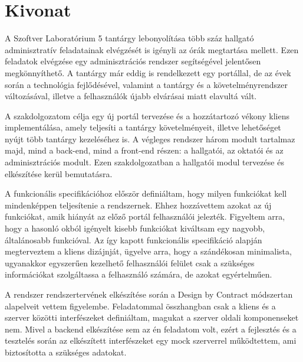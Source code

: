 \setcounter{page}{1}

\hungarianParagraph


\chapter*{Kivonat}

A Szoftver Laboratórium 5 tantárgy lebonyolítása több száz hallgató adminisztratív feladatainak elvégzését is igényli az órák megtartása mellett. Ezen feladatok elvégzése egy adminisztrációs rendszer segítségével jelentősen megkönnyíthető. A tantárgy már eddig is rendelkezett egy portállal, de az évek során a technológia fejlődésével, valamint a tantárgy és a követelményrendszer változásával, illetve a felhasználók újabb elvárásai miatt elavultá vált. 

A szakdolgozatom célja egy új portál tervezése és a hozzátartozó vékony kliens implementálása, amely teljesíti a tantárgy követelményeit, illetve lehetőséget nyújt több tantárgy kezeléséhez is. A végleges rendszer három modult tartalmaz majd, mind a back-end, mind a front-end részen: a hallgatói, az oktatói és az adminisztrációs modult. Ezen szakdolgozatban a hallgatói modul tervezése és elkészítése kerül bemutatásra.

A funkcionális specifikációhoz először definiáltam, hogy milyen funkciókat kell mindenképpen teljesítenie a rendszernek. Ehhez hozzávettem azokat az új funkciókat, amik hiányát az előző portál felhasználói jelezték. Figyeltem arra, hogy a hasonló okból igényelt kisebb funkciókat kiváltsam egy nagyobb, általánosabb funkcióval. Az így kapott funkcionális specifikáció alapján megterveztem a kliens dizájnját, ügyelve arra, hogy a szándékosan minimalista, ugyanakkor egyszerűen kezelhető felhasználói felület csak a szükséges információkat szolgáltassa a felhasználó számára, de azokat egyértelműen.

A rendszer rendszertervének elkészítése során  a Design by Contract módszertan alapelveit vettem figyelembe. Feladatommal összhangban csak a kliens és a szerver közötti interfészeket definiáltam, magukat a szerver oldali komponenseket nem. Mivel a backend elkészítése sem az én feladatom volt, ezért a fejlesztés és a tesztelés során az elkészített interfészeket egy mock szerverrel működtettem, ami biztosította a szükséges adatokat. 

